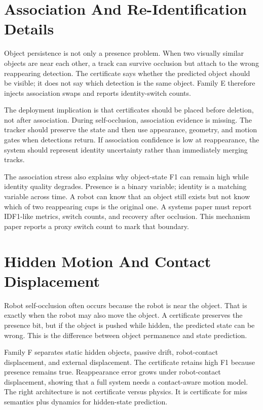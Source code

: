 \documentclass{article}
\begin{document}
\section{Association And Re-Identification Details}

Object persistence is not only a presence problem. When two visually similar
objects are near each other, a track can survive occlusion but attach to the
wrong reappearing detection. The certificate says whether the predicted object
should be visible; it does not say which detection is the same object. Family E
therefore injects association swaps and reports identity-switch counts.

The deployment implication is that certificates should be placed before
deletion, not after association. During self-occlusion, association evidence is
missing. The tracker should preserve the state and then use appearance,
geometry, and motion gates when detections return. If association confidence is
low at reappearance, the system should represent identity uncertainty rather
than immediately merging tracks.

The association stress also explains why object-state F1 can remain high while
identity quality degrades. Presence is a binary variable; identity is a matching
variable across time. A robot can know that an object still exists but not know
which of two reappearing cups is the original one. A systems paper must report
IDF1-like metrics, switch counts, and recovery after occlusion. This mechanism
paper reports a proxy switch count to mark that boundary.

\section{Hidden Motion And Contact Displacement}

Robot self-occlusion often occurs because the robot is near the object. That is
exactly when the robot may also move the object. A certificate preserves the
presence bit, but if the object is pushed while hidden, the predicted state can
be wrong. This is the difference between object permanence and state
prediction.

Family F separates static hidden objects, passive drift, robot-contact
displacement, and external displacement. The certificate retains high F1 because
presence remains true. Reappearance error grows under robot-contact
displacement, showing that a full system needs a contact-aware motion model.
The right architecture is not certificate versus physics. It is certificate for
miss semantics plus dynamics for hidden-state prediction.
\end{document}
